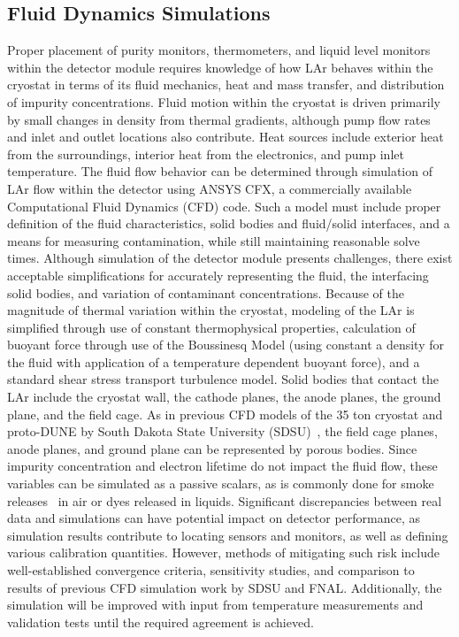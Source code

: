 \subsection{Fluid Dynamics Simulations}
\label{sec:fdgen-slow-cryo-cfd}
Proper placement of purity monitors, thermometers, and liquid level monitors within the detector module requires knowledge of how LAr behaves within the cryostat in terms of its fluid mechanics, heat and mass transfer, and distribution of impurity concentrations. 
Fluid motion within the cryostat is driven primarily by small changes in density from thermal gradients, although pump flow rates and inlet and outlet locations also contribute. 
Heat sources include exterior heat from the surroundings, interior heat from the electronics, and pump inlet temperature. 
The fluid flow behavior can be determined through simulation of LAr flow within the detector using ANSYS CFX, a commercially available Computational Fluid Dynamics (CFD) code. Such a model must include proper definition of the fluid characteristics, solid bodies and fluid/solid interfaces, and a means for measuring contamination, while still maintaining reasonable solve times.
Although simulation of the detector module presents challenges, there exist acceptable simplifications for accurately representing the fluid, the interfacing solid bodies, and variation of contaminant concentrations. Because of the magnitude of thermal variation within the cryostat, modeling of the LAr is simplified through use of constant thermophysical properties, calculation of buoyant force through use of the Boussinesq Model (using constant a density for the fluid with application of a temperature dependent buoyant force), and a standard shear stress transport turbulence model. Solid bodies that contact the LAr include the cryostat wall, the cathode planes, the anode planes, the ground plane, and the field cage. As in previous CFD models of the 35 ton cryostat and proto-DUNE by South Dakota State University (SDSU)~\cite{docdb-5915}, the field cage planes, anode planes, and ground plane can be represented by porous bodies. Since impurity concentration and electron lifetime do not impact the fluid flow, these variables can be simulated as a passive scalars, as is commonly done for smoke releases~\cite{cfd-1} in air or dyes released in liquids.
Significant discrepancies between real data and simulations can have potential impact on detector performance, as simulation results contribute to locating sensors and monitors, as well as defining various calibration quantities. However, methods of mitigating such risk include well-established convergence criteria, sensitivity studies, and comparison to results of previous CFD simulation work by SDSU and FNAL. Additionally, the simulation will be improved with input from temperature measurements and validation tests until the required agreement is achieved.


  
